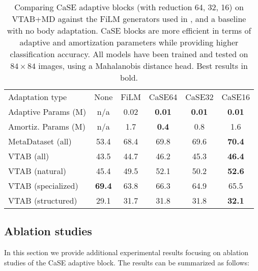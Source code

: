 \documentclass{article}
\begin{document}
\begin{table}[H]
\caption{Comparing CaSE adaptive blocks (with reduction 64, 32, 16) on VTAB+MD against the FiLM generators used in \cite{bronskill2021memory}, and a baseline with no body adaptation. CaSE blocks are more efficient in terms of adaptive and amortization parameters while providing higher classification accuracy. All models have been trained and tested on $84 \times 84$ images, using a Mahalanobis distance head. Best results in bold.}
\vskip 0.15in
\begin{center}
\begin{tabular}{lccccc}
\toprule
Adaptation type & None & FiLM & CaSE64 & CaSE32 & CaSE16 \\
Adaptive Params (M) & n/a & 0.02 & \textbf{0.01} & \textbf{0.01} & \textbf{0.01} \\
Amortiz. Params (M) & n/a & 1.7 & \textbf{0.4} & 0.8 & 1.6\\
\midrule
MetaDataset (all) & 53.4 & 68.4 & 69.8 & 69.6 & \textbf{70.4}\\
VTAB (all) & 43.5 & 44.7 & 46.2 & 45.3 & \textbf{46.4}\\
VTAB (natural) & 45.4 & 49.5 & 52.1 & 50.2 & \textbf{52.6}\\
VTAB (specialized) & \textbf{69.4} & 63.8 & 66.3 & 64.9 & 65.5\\
VTAB (structured) & 29.1 & 31.7 & 31.8 & 31.8 & \textbf{32.1}\\
\bottomrule
\end{tabular}
\end{center}
\vskip -0.1in
\end{table}


\subsection{Ablation studies} \label{appendix:ssec_ablation}

In this section we provide additional experimental results focusing on ablation studies of the CaSE adaptive block. The results can be summarized as follows:
\end{document}
